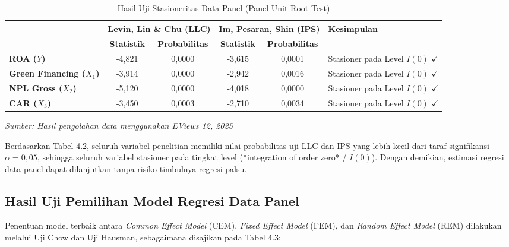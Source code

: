 \documentclass[12pt,a4paper]{article}
\numberwithin{equation}{section}
\begin{document}
\begin{table}[H]
  \caption{Hasil Uji Stasioneritas Data Panel (Panel Unit Root Test)}
  \label{tab:unit_root}
  \begin{tabularx}{\textwidth}{|>{\raggedright\arraybackslash}p{2.4cm}|c|c|c|c|>{\raggedright\arraybackslash}X|}
    \hline
    \multirow{2}{*}{\textbf{Variabel}} & \multicolumn{2}{c|}{\textbf{Levin, Lin \& Chu (LLC)}} & \multicolumn{2}{c|}{\textbf{Im, Pesaran, Shin (IPS)}} & \multirow{2}{*}{\textbf{Kesimpulan}} \\
    \cline{2-5}
    & \textbf{Statistik} & \textbf{Probabilitas} & \textbf{Statistik} & \textbf{Probabilitas} & \\
    \hline
    \textbf{ROA ($Y$)} & -4,821 & 0,0000 & -3,615 & 0,0001 & Stasioner pada Level $I(0)$ $\checkmark$ \\
    \hline
    \textbf{Green Financing ($X_1$)} & -3,914 & 0,0000 & -2,942 & 0,0016 & Stasioner pada Level $I(0)$ $\checkmark$ \\
    \hline
    \textbf{NPL Gross ($X_2$)} & -5,120 & 0,0000 & -4,018 & 0,0000 & Stasioner pada Level $I(0)$ $\checkmark$ \\
    \hline
    \textbf{CAR ($X_3$)} & -3,450 & 0,0003 & -2,710 & 0,0034 & Stasioner pada Level $I(0)$ $\checkmark$ \\
    \hline
  \end{tabularx}
  \begin{flushleft}
    \textit{Sumber: Hasil pengolahan data menggunakan EViews 12, 2025}
  \end{flushleft}
\end{table}

\noindent
Berdasarkan Tabel 4.2, seluruh variabel penelitian memiliki nilai probabilitas uji LLC dan IPS yang lebih kecil dari taraf signifikansi $\alpha = 0{,}05$, sehingga seluruh variabel stasioner pada tingkat level (*integration of order zero* / $I(0)$). Dengan demikian, estimasi regresi data panel dapat dilanjutkan tanpa risiko timbulnya regresi palsu.

\subsection{Hasil Uji Pemilihan Model Regresi Data Panel}

\noindent
Penentuan model terbaik antara \emph{Common Effect Model} (CEM), \emph{Fixed Effect Model} (FEM), dan \emph{Random Effect Model} (REM) dilakukan melalui Uji Chow dan Uji Hausman, sebagaimana disajikan pada Tabel 4.3:
\end{document}
